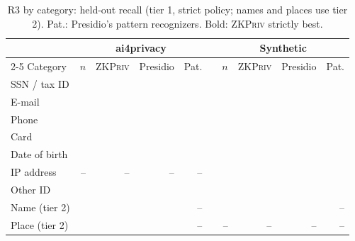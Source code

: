 \documentclass[conference]{IEEEtran}
\newcommand{\sys}{\textsc{ZKPriv}}
\begin{document}
\begin{table}[t]
\caption{R3 by category: held-out recall (tier 1, strict policy; names and places use tier 2). Pat.: Presidio's pattern recognizers. Bold: \sys{} strictly best.}
\label{tab:r3}
\centering\footnotesize
\setlength{\tabcolsep}{2.5pt}
\begin{tabular}{@{}lrrrrcrrrr@{}}
\toprule
& \multicolumn{4}{c}{ai4privacy} && \multicolumn{4}{c}{Synthetic} \\
\cmidrule{2-5}\cmidrule{7-10}
Category & $n$ & \sys{} & Presidio & Pat. && $n$ & \sys{} & Presidio & Pat. \\
\midrule
SSN / tax ID  & \tAiNSsnTaxId{} & \tAiStrictGSsnTaxId{} & \tAiPresGSsnTaxId{} & \tAiPresRxGSsnTaxId{} && \tSynNSsnTaxId{} & \tSynStrictGSsnTaxId{} & \tSynPresGSsnTaxId{} & \tSynPresRxGSsnTaxId{} \\
E-mail        & \tAiNEMail{} & \tAiStrictGEMail{} & \tAiPresGEMail{} & \tAiPresRxGEMail{} && \tSynNEMail{} & \textbf{\tSynStrictGEMail{}} & \tSynPresGEMail{} & \tSynPresRxGEMail{} \\
Phone         & \tAiNPhone{} & \textbf{\tAiStrictGPhone{}} & \tAiPresGPhone{} & \tAiPresRxGPhone{} && \tSynNPhone{} & \textbf{\tSynStrictGPhone{}} & \tSynPresGPhone{} & \tSynPresRxGPhone{} \\
Card          & \tAiNCard{} & \textbf{\tAiStrictGCard{}} & \tAiPresGCard{} & \tAiPresRxGCard{} && \tSynNCard{} & \textbf{\tSynStrictGCard{}} & \tSynPresGCard{} & \tSynPresRxGCard{} \\
Date of birth & \tAiNDateOfBirth{} & \textbf{\tAiStrictGDateOfBirth{}} & \tAiPresGDateOfBirth{} & \tAiPresRxGDateOfBirth{} && \tSynNDateOfBirth{} & \tSynStrictGDateOfBirth{} & \tSynPresGDateOfBirth{} & \tSynPresRxGDateOfBirth{} \\
IP address    & -- & -- & -- & -- && \tSynNIpAddress{} & \tSynStrictGIpAddress{} & \tSynPresGIpAddress{} & \tSynPresRxGIpAddress{} \\
Other ID      & \tAiNOtherId{} & \tAiStrictGOtherId{} & \tAiPresGOtherId{} & \tAiPresRxGOtherId{} && \tSynNOtherId{} & \textbf{\tSynStrictGOtherId{}} & \tSynPresGOtherId{} & \tSynPresRxGOtherId{} \\
\midrule
Name (tier 2)  & \tAiNName{} & \tAiStrictTGName{} & \tAiPresGName{} & -- && \tSynNName{} & \tSynStrictTGName{} & \tSynPresGName{} & -- \\
Place (tier 2) & \tAiNPlace{} & \tAiStrictTGPlace{} & \tAiPresGPlace{} & -- && -- & -- & -- & -- \\
\bottomrule
\end{tabular}
\end{table}
\end{document}
